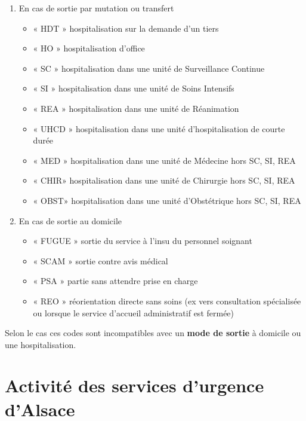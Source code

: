 \documentclass[12pt,english,french,twoside]{book}\usepackage[]{graphicx}\usepackage[]{color}
\begin{document}
\begin{enumerate}
  \item En cas de sortie par mutation ou transfert
    \begin{itemize}
      \item « HDT » hospitalisation sur la demande d’un tiers
      \item « HO » hospitalisation d’office
      \item « SC » hospitalisation dans une unité de Surveillance Continue
      \item « SI » hospitalisation dans une unité de Soins Intensifs
      \item « REA » hospitalisation dans une unité de Réanimation
      \item « UHCD » hospitalisation dans une unité d’hospitalisation de courte durée
      \item « MED » hospitalisation dans une unité de Médecine hors SC, SI, REA
      \item « CHIR» hospitalisation dans une unité de Chirurgie hors SC, SI, REA
      \item « OBST» hospitalisation dans une unité d’Obstétrique hors SC, SI, REA
    \end{itemize}

  \item En cas de sortie au domicile
    \begin{itemize}
      \item « FUGUE » sortie du service à l’insu du personnel soignant
      \item « SCAM » sortie contre avis médical
      \item « PSA » partie sans attendre prise en charge
      \item « REO » réorientation directe sans soins (ex vers consultation spécialisée ou   lorsque le service d’accueil administratif est fermée)
    \end{itemize}

\end{enumerate}

Selon le cas ces codes sont incompatibles avec un \textbf{mode de sortie} à domicile ou une hospitalisation.



\part{Activité des services d'urgence d'Alsace}
\end{document}
